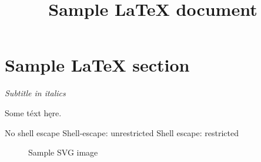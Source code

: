 \documentclass[12pt]{article}
\title{Sample LaTeX document}
\begin{document}
\section*{Sample \LaTeX{} section}
\vspace{-1em}

\textit{Subtitle in italics}

Some téxt hęre.

\ifcase\ShellEscapeStatus
  No shell escape\or
  Shell-escape: unrestricted\or
  Shell escape: restricted%
\fi

\begin{figure}[htbp]
  \centering
  
  \caption{Sample SVG image}
\end{figure}
\end{document}
